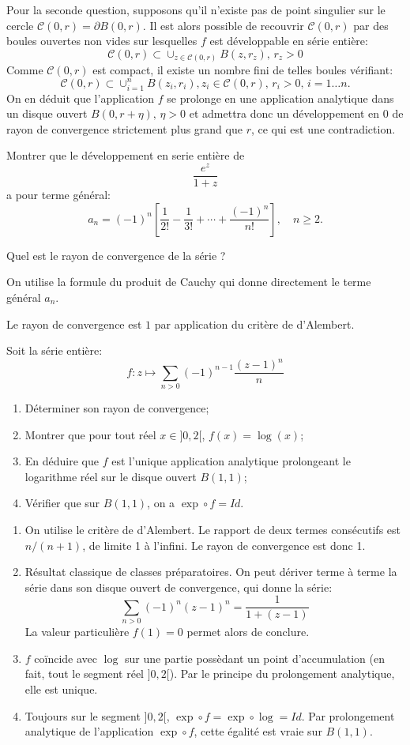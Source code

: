 Pour la seconde question, supposons qu'il n'existe pas de point singulier sur le cercle $\mathcal{C}(0,r)=\partial B(0,r).$ Il est alors possible de recouvrir $\mathcal{C}(0,r)$ par des boules ouvertes non vides sur lesquelles $f$ est développable en série entière:
\[
\mathcal{C}(0,r) \subset \cup_{z \in \mathcal{C}(0,r)} B(z,r_z), \, r_z > 0
\]
Comme $\mathcal{C}(0,r)$ est compact, il existe un nombre fini de telles boules vérifiant:
\[
\mathcal{C}(0,r) \subset \cup_{i=1}^n B(z_i, r_i), z_i \in \mathcal{C}(0,r), \, r_i > 0, \, i=1\dots n.
\]
On en déduit que l'application $f$ se prolonge en une application analytique dans un disque ouvert $B\left(0,r+\eta\right),\, \eta > 0$ et admettra donc un développement en $0$ de rayon de convergence strictement plus grand que $r$, ce qui est une contradiction.
\begin{fex}
Montrer que le développement en serie entière de 
\[\frac{e^z}{1+z}\]
a pour terme général:
\[a_n=(-1)^n \left[\frac{1}{2!} - \frac{1}{3!} + \cdots + \frac{(-1)^n}{n!}\right], \quad n \geq 2.\]

Quel est le rayon de convergence de la série ?
\end{fex}
On utilise la formule du produit de Cauchy qui donne directement le terme général $a_n.$

Le rayon de convergence est $1$ par application du critère de d'Alembert.
\begin{fex}
 Soit la série entière:
\[
f \colon z \mapsto \sum_{n >0}(-1)^{n-1}\frac{(z-1)^n}{n}
\]
\begin{enumerate}
  \item Déterminer son rayon de convergence;
  \item Montrer que pour tout réel $x \in ]0,2[$, $f(x)=\log(x)$;
  \item En déduire que $f$ est l'unique application analytique prolongeant le
  logarithme réel sur le disque ouvert $B(1,1)$;
  \item Vérifier que sur $B(1,1)$, on a $\exp \circ f = Id$.
\end{enumerate}
\end{fex}
\begin{enumerate}
 \item On utilise le critère de d'Alembert. Le rapport de deux termes
consécutifs est $n/(n+1)$, de limite 1 à l'infini. Le rayon de convergence est
donc 1.
\item Résultat classique de classes préparatoires. On peut dériver terme à
terme la série dans son disque ouvert de convergence, qui donne la série:
\[
\sum_{n >0}(-1)^{n} (z-1)^n = \frac{1}{1+(z-1)}
\]
La valeur particulière $f(1)=0$ permet alors de conclure.
\item $f$ coïncide avec $\log$ sur une partie possèdant un point d'accumulation
(en fait, tout le segment réel $]0,2[$). Par le principe du prolongement
analytique, elle est unique.
\item Toujours sur le segment $]0,2[$, $\exp \circ f = \exp \circ \log = Id$.
Par prolongement analytique de l'application $\exp \circ f$, cette égalité est
vraie sur $B(1,1)$.
\end{enumerate}